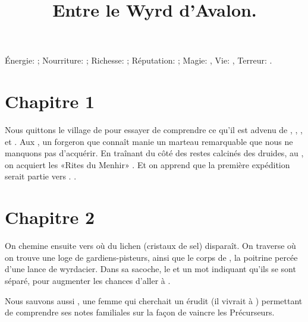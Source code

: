 \documentclass[11pt]{article}
\title{%
Entre le Wyrd d'Avalon.
}
\begin{document}
\maketitle

Énergie: \nrj{}; Nourriture: \nour{}; Richesse: \rich{}; Réputation: \rep{}; Magie: \magic{}, Vie: \life{}, Terreur: \terror{}.

\section{Chapitre 1}

Nous quittons le village de \cuanacht{}  pour essayer de comprendre ce qu'il est advenu de \neante{}, \yvain{}, \aubert{}, \erfir{} et \fael{}. Aux \lames{} , un forgeron que connaît \beor{} manie un marteau remarquable que nous ne manquons pas d'acquérir. En traînant \larve{} du côté des restes calcinés des druides, au \conclave{}, on acquiert les «Rites du Menhir» . Et on apprend que la première expédition serait partie vers \tuathan{}. .

\section{Chapitre 2}


On chemine ensuite vers \blanc{}  où du lichen (cristaux de sel) disparaît. On traverse \tordracine{} où on trouve une loge de gardiens-pisteurs, ainsi que le corps de \fael{}, la poitrine percée d'une lance de wyrdacier. Dans sa sacoche, le \fauxgraal{} et un mot indiquant qu'ils se sont séparé, pour augmenter les chances d'aller à \newcamelot{}.

Nous sauvons aussi \cosuil{}, une femme qui cherchait un érudit (il vivrait à \boismuraille{}) permettant de comprendre ses notes familiales sur la façon de vaincre les Précurseurs.
\end{document}
